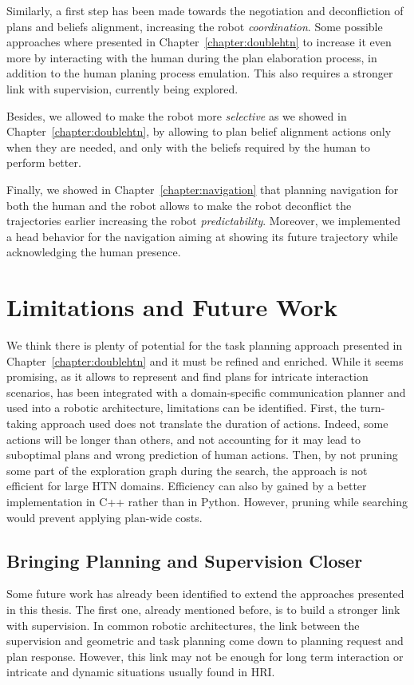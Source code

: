 \documentclass[a4paper,11pt,twoside]{StyleThese}
\begin{document}
Similarly, a first step has been made towards the negotiation and deconfliction of plans and beliefs alignment, increasing the robot \textit{coordination}. Some possible approaches where presented in Chapter~\ref{chapter:doublehtn} to increase it even more by interacting with the human during the plan elaboration process, in addition to the human planing process emulation. This also requires a stronger link with supervision, currently being explored.

Besides, we allowed to make the robot more \textit{selective} as we showed in Chapter~\ref{chapter:doublehtn}, by allowing to plan belief alignment actions only when they are needed, and only with the beliefs required by the human to perform better.

Finally, we showed in Chapter~\ref{chapter:navigation} that planning navigation for both the human and the robot allows to make the robot deconflict the trajectories earlier increasing the robot \textit{predictability}. Moreover, we implemented a head behavior for the navigation aiming at showing its future trajectory while acknowledging the human presence.

\section*{Limitations and Future Work}
We think there is plenty of potential for the task planning approach presented in Chapter~\ref{chapter:doublehtn} and it must be refined and enriched. While it seems promising, as it allows to represent and find plans for intricate interaction scenarios, has been integrated with a domain-specific communication planner and used into a robotic architecture, limitations can be identified. First, the turn-taking approach used does not translate the duration of actions. Indeed, some actions will be longer than others, and not accounting for it may lead to suboptimal plans and wrong prediction of human actions. Then, by not pruning some part of the exploration graph during the search, the approach is not efficient for large HTN domains. Efficiency can also by gained by a better implementation in C++ rather than in Python. However, pruning while searching would prevent applying plan-wide costs.


\subsection*{Bringing Planning and Supervision Closer}
Some future work has already been identified to extend the approaches presented in this thesis. The first one, already mentioned before, is to build a stronger link with supervision. In common robotic architectures, the link between the supervision and geometric and task planning come down to planning request and plan response. However, this link may not be enough for long term interaction or intricate and dynamic situations usually found in HRI.
\end{document}
